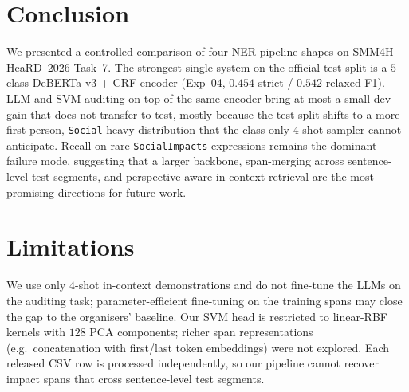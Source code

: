 \documentclass[11pt]{article}
\begin{document}
\section{Conclusion}
\label{sec:conclusion}

We presented a controlled comparison of four NER pipeline shapes on
SMM4H-HeaRD~2026 Task~7. The strongest single system on the
official test split is a $5$-class DeBERTa-v3 + CRF encoder
(Exp~04, $0.454$ strict / $0.542$ relaxed F1). LLM and SVM auditing
on top of the same encoder bring at most a small dev gain that does
not transfer to test, mostly because the test split shifts to a
more first-person, \texttt{Social}-heavy distribution that the
class-only $4$-shot sampler cannot anticipate. Recall on rare
\texttt{SocialImpacts} expressions remains the dominant failure
mode, suggesting that a larger backbone, span-merging across
sentence-level test segments, and perspective-aware in-context
retrieval are the most promising directions for future work.

\section*{Limitations}
We use only $4$-shot in-context demonstrations and do not fine-tune
the LLMs on the auditing task; parameter-efficient fine-tuning on
the training spans may close the gap to the organisers' baseline.
Our SVM head is restricted to linear-RBF kernels with
$128$ PCA components; richer span representations
(e.g.\ concatenation with first/last token embeddings) were not
explored. Each released CSV row is processed independently, so our
pipeline cannot recover impact spans that cross sentence-level
test segments.


\end{document}
